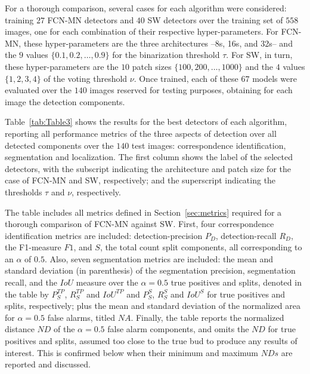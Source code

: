 \documentclass[a4paper,authoryear,review]{elsarticle}
\begin{document}
For a thorough comparison, several cases for each algorithm were considered: training $27$ FCN-MN detectors and $40$ SW detectors over the training set of $558$ images, one for each combination of their respective hyper-parameters. For FCN-MN, these hyper-parameters are the three architectures --8s, 16s, and 32s-- and the $9$ values $\{0.1, 0.2, \ldots, 0.9\}$ for the binarization threshold $\tau$. For SW, in turn, these hyper-parameters are the $10$ patch sizes $\{100, 200, \ldots, 1000\}$ and the $4$ values $\{1, 2, 3, 4\}$ of the voting threshold $\nu$. Once trained, each of these $67$ models were evaluated over the $140$ images reserved for testing purposes, obtaining for each image the detection components.

Table~\ref{tab:Table3} shows the results for the best detectors of each algorithm, reporting all performance metrics of the three aspects of detection over all detected components over the $140$ test images: correspondence identification, segmentation and localization. The first column shows the label of the selected detectors, with the subscript indicating the architecture and patch size for the case of FCN-MN and SW, respectively; and the superscript indicating the thresholds $\tau$ and $\nu$, respectively.

The table includes all metrics defined in Section~\ref{sec:metrics} required for a thorough comparison of FCN-MN against SW. First, four correspondence identification metrics are included: detection-precision $P_D$, detection-recall $R_D$, the F1-measure $F1$, and $S$, the total count split components, all corresponding to an $\alpha$ of $0.5$. Also, seven segmentation metrics are included: the mean and standard deviation (in parenthesis) of the segmentation precision, segmentation recall, and the $IoU$ measure over the $\alpha=0.5$ true positives and splits, denoted in the table by $P_S^{TP}$, $R_S^{TP}$ and $IoU^{TP}$ and $P_S^S$, $R_S^S$ and $IoU^S$ for true positives and splits, respectively; plus the mean and standard deviation of the normalized area for $\alpha=0.5$ false alarms, titled $NA$. 
%
Finally, the table reports the normalized distance $ND$ of the $\alpha=0.5$ false alarm components, and omits the $ND$ for true positives and splits, assumed too close to the true bud to produce any results of interest. This is confirmed below when their minimum and maximum $NDs$ are reported and discussed. 
\end{document}
